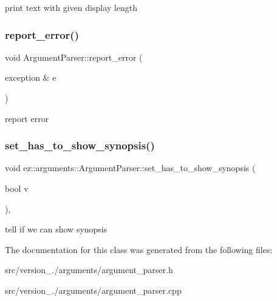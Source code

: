 print text with given display length \mbox{\label{classez_1_1arguments_1_1ArgumentParser_a19a161953f44e5f8c02ad53c4f9c660b}} 
\subsubsection{\texorpdfstring{report\+\_\+error()}{report\_error()}}
{\footnotesize\ttfamily void Argument\+Parser\+::report\+\_\+error (\begin{DoxyParamCaption}\item[{exception \&}]{e }\end{DoxyParamCaption})}

report error \mbox{\label{classez_1_1arguments_1_1ArgumentParser_a0eedf118bbdf897606e5a0ebf6183102}} 
\subsubsection{\texorpdfstring{set\+\_\+has\+\_\+to\+\_\+show\+\_\+synopsis()}{set\_has\_to\_show\_synopsis()}}
{\footnotesize\ttfamily void ez\+::arguments\+::\+Argument\+Parser\+::set\+\_\+has\+\_\+to\+\_\+show\+\_\+synopsis (\begin{DoxyParamCaption}\item[{bool}]{v }\end{DoxyParamCaption})\hspace{0.3cm}{\ttfamily [inline]}, {\ttfamily [protected]}}

tell if we can show synopsis 

The documentation for this class was generated from the following files\+:\begin{DoxyCompactItemize}
\item 
src/version\+\_./arguments/argument\+\_\+parser.\+h\item 
src/version\+\_./arguments/argument\+\_\+parser.\+cpp\end{DoxyCompactItemize}
